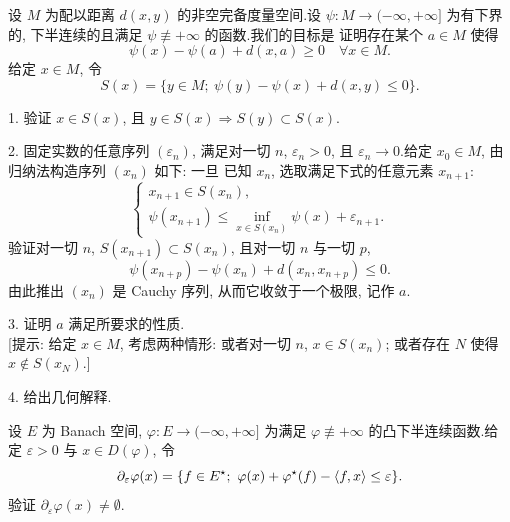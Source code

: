 \begin{problem}
\label{prob:3}


设 $M$ 为配以距离 $d(x,y)$ 的非空完备度量空间.设 $\psi:M\to(-\infty,+\infty]$
为有下界的, 下半连续的且满足 $\psi\not\equiv+\infty$ 的函数.我们的目标是
证明存在某个 $a\in M$ 使得
\begin{equation*}
\psi(x)-\psi(a)+d(x,a)\ge0\quad\forall x\in M.
\end{equation*}
给定 $x\in M$, 令
\begin{equation*}
S(x)=\{y\in M;\ \psi(y)-\psi(x)+d(x,y)\le0\}.
\end{equation*}

1. 验证 $x\in S(x)$, 且 $y\in S(x)\Rightarrow S(y)\subset S(x)$.

2. 固定实数的任意序列 $(\varepsilon_n)$, 满足对一切 $n$, $\varepsilon_n>0$,
且 $\varepsilon_n\to0$.给定 $x_0\in M$, 由归纳法构造序列 $(x_n)$ 如下: 一旦
已知 $x_n$, 选取满足下式的任意元素 $x_{n+1}$:
\begin{equation*}
\begin{cases}
x_{n+1}\in S(x_n),\\
\psi(x_{n+1})\le\inf_{x\in S(x_n)}\psi(x)+\varepsilon_{n+1}.
\end{cases}
\end{equation*}
验证对一切 $n$, $S(x_{n+1})\subset S(x_n)$, 且对一切 $n$ 与一切 $p$,
\begin{equation*}
\psi(x_{n+p})-\psi(x_n)+d(x_n,x_{n+p})\le0.
\end{equation*}
由此推出 $(x_n)$ 是 Cauchy 序列, 从而它收敛于一个极限, 记作 $a$.

3. 证明 $a$ 满足所要求的性质.\\
{[提示: 给定 $x\in M$, 考虑两种情形: 或者对一切 $n$, $x\in S(x_n)$; 或者存在
$N$ 使得 $x\notin S(x_N)$.]}

4. 给出几何解释.


设 $E$ 为 Banach 空间, $\varphi:E\to(-\infty,+\infty]$ 为满足
$\varphi\not\equiv+\infty$ 的凸下半连续函数.给定 $\varepsilon>0$ 与
$x\in D(\varphi)$, 令
\begin{equation*}
\partial_\varepsilon\varphi(x)=\{f\in E^\star;\ \varphi(x)+\varphi^\star(f)-\dual{f}{x}\le\varepsilon\}.
\end{equation*}
验证 $\partial_\varepsilon\varphi(x)\ne\emptyset$.


\end{problem}
